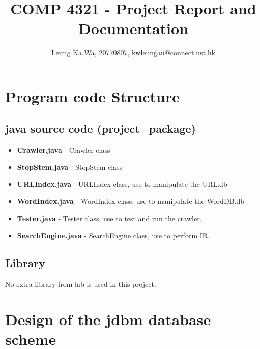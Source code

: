 \documentclass{article}
\title{COMP 4321 - Project Report and Documentation}
\author{Leung Ka Wa, 20770807, kwleungau@connect.ust.hk}
\date{}
\begin{document}
    \maketitle
    \section*{Program code Structure}
        \subsection*{java source code (project\_package)}
            \begin{itemize}
                \item \textbf{Crawler.java} - Crawler class
                \item \textbf{StopStem.java} - StopStem class
                \item \textbf{URLIndex.java} - URLIndex class, use to manipulate the URL.db
                \item \textbf{WordIndex.java} - WordIndex class, use to manipulate the WordDB.db
                \item \textbf{Tester.java} - Tester class, use to test and run the crawler.
                \item \textbf{SearchEngine.java} - SearchEngine class, use to perform IR.
            \end{itemize}
        \subsection*{Library}
            No extra library from lab is used in this project.

    \section*{Design of the jdbm database scheme}
\end{document}
